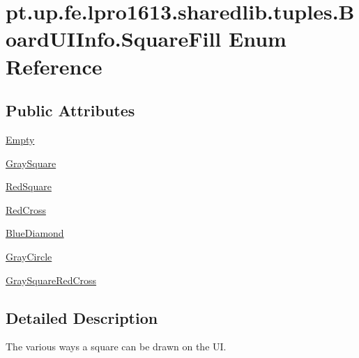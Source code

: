 \hypertarget{enumpt_1_1up_1_1fe_1_1lpro1613_1_1sharedlib_1_1tuples_1_1_board_u_i_info_1_1_square_fill}{}\section{pt.\+up.\+fe.\+lpro1613.\+sharedlib.\+tuples.\+Board\+U\+I\+Info.\+Square\+Fill Enum Reference}
\label{enumpt_1_1up_1_1fe_1_1lpro1613_1_1sharedlib_1_1tuples_1_1_board_u_i_info_1_1_square_fill}
\subsection*{Public Attributes}
\begin{DoxyCompactItemize}
\item 
\hyperlink{enumpt_1_1up_1_1fe_1_1lpro1613_1_1sharedlib_1_1tuples_1_1_board_u_i_info_1_1_square_fill_af67b97ac891abc7f497730b69ed2225c}{Empty}
\item 
\hyperlink{enumpt_1_1up_1_1fe_1_1lpro1613_1_1sharedlib_1_1tuples_1_1_board_u_i_info_1_1_square_fill_a7563052947b37e4b4c56ebd1d2bf409b}{Gray\+Square}
\item 
\hyperlink{enumpt_1_1up_1_1fe_1_1lpro1613_1_1sharedlib_1_1tuples_1_1_board_u_i_info_1_1_square_fill_a7d344f869733c45dc5ae75ea84b2ac60}{Red\+Square}
\item 
\hyperlink{enumpt_1_1up_1_1fe_1_1lpro1613_1_1sharedlib_1_1tuples_1_1_board_u_i_info_1_1_square_fill_a0f63a4642657ee658d936a9b2a84b087}{Red\+Cross}
\item 
\hyperlink{enumpt_1_1up_1_1fe_1_1lpro1613_1_1sharedlib_1_1tuples_1_1_board_u_i_info_1_1_square_fill_ad27b68cd7873aec72cc77cd2b988f1e4}{Blue\+Diamond}
\item 
\hyperlink{enumpt_1_1up_1_1fe_1_1lpro1613_1_1sharedlib_1_1tuples_1_1_board_u_i_info_1_1_square_fill_a03edb439713896a7f7b1aea039409a80}{Gray\+Circle}
\item 
\hyperlink{enumpt_1_1up_1_1fe_1_1lpro1613_1_1sharedlib_1_1tuples_1_1_board_u_i_info_1_1_square_fill_a8d8289d7d4ac2b3f2e3694f43458b9c7}{Gray\+Square\+Red\+Cross}
\end{DoxyCompactItemize}


\subsection{Detailed Description}
The various ways a square can be drawn on the UI. 

